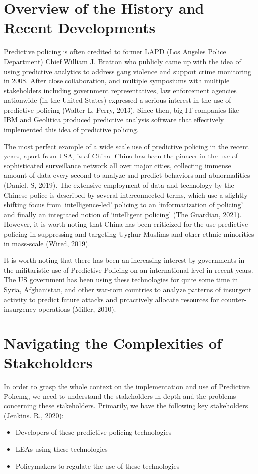 \documentclass[man, noextraspace]{apa7} %
\begin{document}
\section{Overview of the History and Recent Developments}
Predictive policing is often credited to former LAPD (Los Angeles Police Department) Chief 
William J. Bratton who publicly came up with the idea of using predictive analytics to address 
gang violence and support crime monitoring in 2008. After close collaboration, and multiple 
symposiums with multiple stakeholders including government representatives, law enforcement 
agencies nationwide (in the United States) expressed a serious interest in the use of predictive 
policing (Walter L. Perry, 2013). Since then, big IT companies like IBM and Geolitica produced
predictive analysis software that effectively implemented this idea of predictive policing. 

The most perfect example of a wide scale use of predictive policing in the recent years, apart 
from USA, is of China. China has been the pioneer in the use of sophisticated surveillance 
network all over major cities, collecting immense amount of data every second to analyze and 
predict behaviors and abnormalities (Daniel. S, 2019). The extensive employment of data and 
technology by the Chinese police is described by several interconnected terms, which use a 
slightly shifting focus from ‘intelligence-led' policing to an ‘informatization of policing' and 
finally an integrated notion of ‘intelligent policing' (The Guardian, 2021). However, it is worth 
noting that China has been criticized for the use predictive policing in suppressing and targeting 
Uyghur Muslims and other ethnic minorities in mass-scale (Wired, 2019). 

It is worth noting that there has been an increasing interest by governments in the militaristic use 
of Predictive Policing on an international level in recent years. The US government has been 
using these technologies for quite some time in Syria, Afghanistan, and other war-torn countries 
to analyze patterns of insurgent activity to predict future attacks and proactively allocate 
resources for counter-insurgency operations (Miller, 2010). \vspace{1cm}

\section{Navigating the Complexities of Stakeholders}
In order to grasp the whole context on the implementation and use of Predictive Policing, we 
need to understand the stakeholders in depth and the problems concerning these stakeholders. 
Primarily, we have the following key stakeholders (Jenkins. R., 2020):
\begin{itemize}
    \item Developers of these predictive policing technologies
    \item LEAs using these technologies
    \item Policymakers to regulate the use of these technologies

\end{itemize} 
\end{document}
